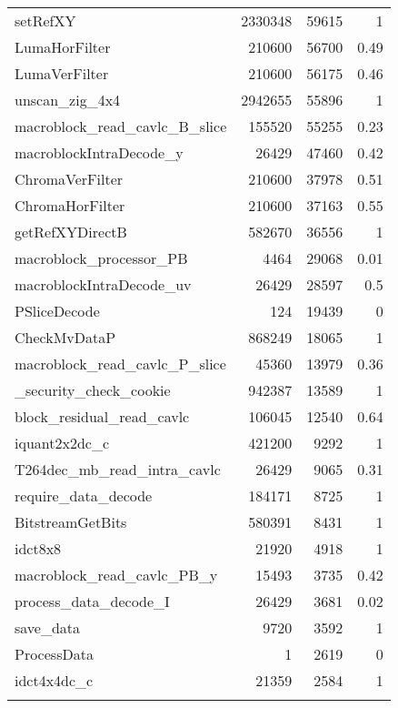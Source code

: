 \begin{longtable}[\textwidth]{lrrr}
    setRefXY					&	2330348	&	59615	&	1		\\
    LumaHorFilter				&	210600	&	56700	&	0.49	\\ \rowcolor{gray!15}
    LumaVerFilter				&	210600	&	56175	&	0.46	\\
    unscan\_zig\_4x4			&	2942655	&	55896	&	1		\\ \rowcolor{gray!15}
    macroblock\_read\_cavlc\_B\_slice
    							&	155520	&	55255	&	0.23	\\
    macroblockIntraDecode\_y	&	26429	&	47460	&	0.42	\\ \rowcolor{gray!15}
    ChromaVerFilter			&	210600	&	37978	&	0.51	\\
    ChromaHorFilter			&	210600	&	37163	&	0.55	\\ \rowcolor{gray!15}
    getRefXYDirectB			&	582670	&	36556	&	1		\\
    macroblock\_processor\_PB	&	4464 	&	29068	&	0.01	\\ \rowcolor{gray!15}
    macroblockIntraDecode\_uv	&	26429	&	28597	&	0.5		\\
    PSliceDecode				&	124  	&	19439	&	0		\\ \rowcolor{gray!15}
    CheckMvDataP				&	868249	&	18065	&	1		\\
    macroblock\_read\_cavlc\_P\_slice	
    							&	45360	&	13979	&	0.36	\\ \rowcolor{gray!15}
    \_security\_check\_cookie	&	942387	&	13589	&	1		\\
    block\_residual\_read\_cavlc	
    							&	106045	&	12540	&	0.64	\\ \rowcolor{gray!15}
    iquant2x2dc\_c				&	421200	&	9292 	&	1		\\
    T264dec\_mb\_read\_intra\_cavlc	
    							&	26429	&	9065 	&	0.31	\\ \rowcolor{gray!15}
    require\_data\_decode		&	184171	&	8725 	&	1		\\
    BitstreamGetBits			&	580391	&	8431 	&	1		\\ \rowcolor{gray!15}
    idct8x8						&	21920	&	4918 	&	1		\\
    macroblock\_read\_cavlc\_PB\_y	
    							&	15493	&	3735 	&	0.42	\\ \rowcolor{gray!15}
    process\_data\_decode\_I	&	26429	&	3681 	&	0.02	\\
    save\_data					&	9720 	&	3592 	&	1		\\ \rowcolor{gray!15}
    ProcessData				&	1    	&	2619 	&	0		\\
    idct4x4dc\_c				&	21359	&	2584 	&	1		\\ \rowcolor{gray!15}

\end{longtable}
